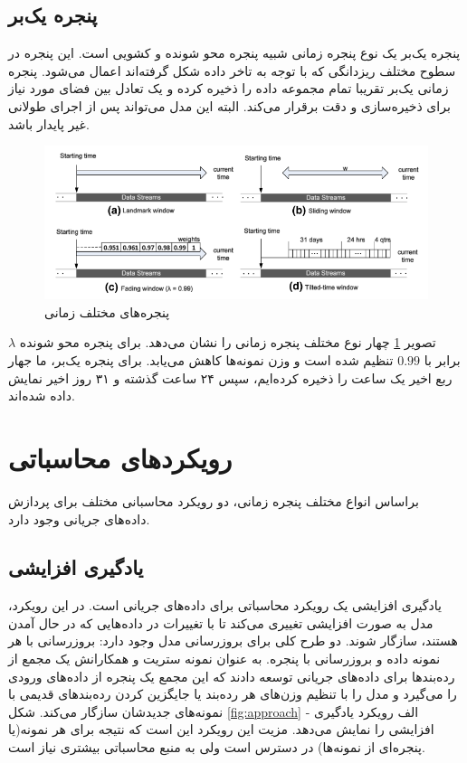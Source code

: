 \subsection{پنجره یک‌بر}
پنجره یک‌بر یک نوع پنجره زمانی شبیه پنجره محو شونده و کشویی است. این پنجره در سطوح مختلف ریزدانگی که با توجه به تاخر داده شکل گرفته‌اند اعمال می‌شود. پنجره زمانی‌ یک‌بر تقریبا تمام مجموعه داده را ذخیره کرده و یک تعادل بین فضای مورد نیاز برای ذخیره‌سازی و دقت برقرار می‌کند. البته این‌ مدل می‌تواند پس از اجرای طولانی غیر پایدار باشد.

\begin{figure}%
\centerline{\includegraphics[width=15cm]{time-windows}}
\caption{پنجره‌های مختلف زمانی}
\label{fig:time-windows}
\end{figure}
تصویر
\ref{fig:time-windows}
چهار نوع مختلف پنجره زمانی را نشان می‌دهد. برای پنجره محو شونده $\lambda$ برابر با $0.99$ تنظیم شده است و وزن نمونه‌ها کاهش می‌یابد. برای پنجره یک‌بر، ما جهار ربع اخیر یک ساعت را ذخیره کرده‌ایم، سپس ۲۴ ساعت گذشته و ۳۱ روز اخیر نمایش داده شده‌اند.




\section{رویکردهای محاسباتی}

براساس انواع مختلف پنجره زمانی، دو رویکرد محاسبانی مختلف برای پردازش داده‌های جریانی وجود دارد.

\subsection{یادگیری افزایشی}
یادگیری افزایشی یک رویکرد محاسباتی برای داده‌های جریانی است. در این رویکرد، مدل به صورت افزایشی تغییری می‌کند تا با تغییرات در داده‌هایی که در حال آمدن هستند، سازگار شوند. دو طرح کلی برای بروزرسانی مدل وجود دارد: بروزرسانی با هر نمونه داده و بروزرسانی با پنجره. به عنوان نمونه ستریت
و همکارانش یک مجمع از رده‌بندها برای داده‌های جریانی توسعه‌ دادند که این مجمع یک پنجره از داده‌های ورودی را می‌گیرد و مدل را با تنظیم وزن‌های هر رده‌بند یا جایگزین کردن رده‌بند‌های قدیمی با نمونه‌های جدیدشان سازگار می‌کند. شکل
\ref{fig:approach}
- الف رویکرد یادگیری افزایشی را نمایش می‌دهد. مزیت این رویکرد این است که نتیجه برای هر نمونه(یا پنجره‌ای از نمونه‌ها) در دسترس است ولی به منبع محاسباتی بیشتری نیاز است.
